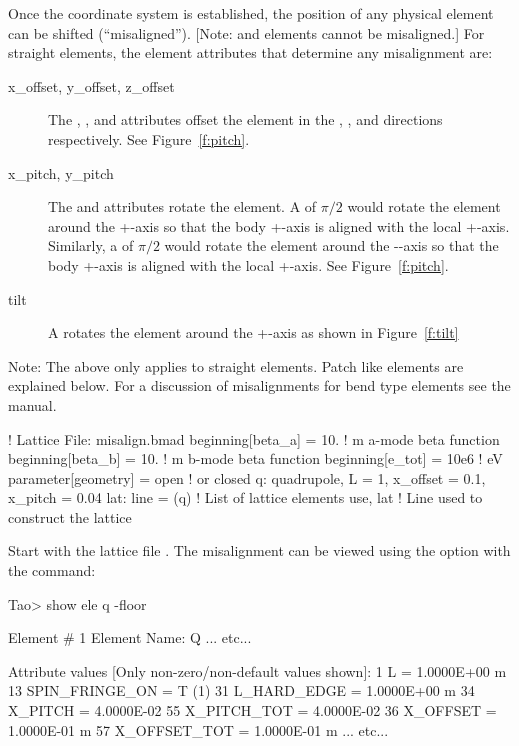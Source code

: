 \documentclass{hitec}     %
\begin{document}
{Once the  coordinate system is established, the position of any physical element
can be shifted (``misaligned''). [Note:  and  elements cannot be misaligned.]
For straight elements, the element attributes that determine any misalignment are:
\begin{description}
\item[x_offset, y_offset, z_offset] \Newline
The , , and  attributes offset the element in the , ,
and  directions respectively. See Figure~\ref{f:pitch}.
%
\item[x_pitch, y_pitch] \Newline
The  and  attributes rotate the element. A  of $\pi/2$ would rotate the
element around the +-axis so that the body +-axis is aligned with the local
+-axis. Similarly, a  of $\pi/2$ would rotate the element around the --axis so
that the body +-axis is aligned with the local +-axis. See Figure~\ref{f:pitch}.
%
\item[tilt] \Newline
A  rotates the element around the +-axis as shown in Figure~\ref{f:tilt}
\end{description}

Note: The above only applies to straight elements. Patch like elements are explained below. For a
discussion of misalignments for bend type elements see the \bmad manual.

\begin{code}
! Lattice File: misalign.bmad
beginning[beta_a] = 10.   ! m  a-mode beta function
beginning[beta_b] = 10.   ! m  b-mode beta function
beginning[e_tot] = 10e6   ! eV
parameter[geometry] = open  ! or closed
q: quadrupole, L = 1, x_offset = 0.1, x_pitch = 0.04
lat: line = (q)   ! List of lattice elements
use, lat          ! Line used to construct the lattice
\end{code}

Start \tao with the lattice file . The
misalignment can be viewed using the  option with the  command:
\begin{code} 
Tao> show ele q -floor

 Element #                1
 Element Name: Q
... etc...

 Attribute values [Only non-zero/non-default values shown]:
    1  L               =  1.0000E+00 m
   13  SPIN_FRINGE_ON  =  T (1)
   31  L_HARD_EDGE     =  1.0000E+00 m
   34  X_PITCH         =  4.0000E-02       55  X_PITCH_TOT   =  4.0000E-02
   36  X_OFFSET        =  1.0000E-01 m     57  X_OFFSET_TOT  =  1.0000E-01 m
... etc...


\end{code}}
\end{document}
